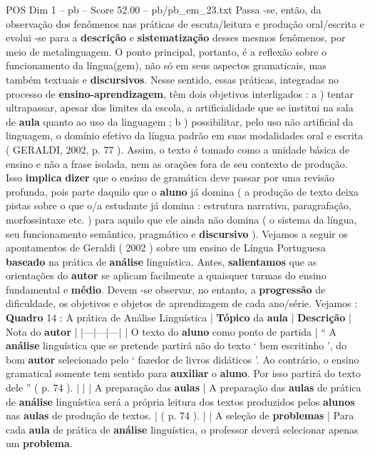 \begin{textsample}{POS Dim 1 – pb – Score 52.00 – pb/pb\_em\_23.txt}
Passa -se, então, da observação dos fenômenos nas práticas de escuta/leitura e produção oral/escrita e evolui -se para a \textbf{descrição} e \textbf{sistematização} desses mesmos fenômenos, por meio de metalinguagem.
O ponto principal, portanto, é a reflexão sobre o funcionamento da língua(gem), não só em seus aspectos gramaticais, mas também textuais e \textbf{discursivos}.
Nesse sentido, essas práticas, integradas no processo de \textbf{ensino-aprendizagem}, têm dois objetivos interligados : a ) tentar ultrapassar, apesar dos limites da escola, a artificialidade que se institui na sala de \textbf{aula} quanto ao uso da linguagem ; b ) possibilitar, pelo uso não artificial da linguagem, o domínio efetivo da língua padrão em suas modalidades oral e escrita ( GERALDI, 2002, p. 77 ).
Assim, o texto é tomado como a unidade básica de ensino e não a frase isolada, nem as orações fora de seu contexto de produção.
Isso \textbf{implica} \textbf{dizer} que o ensino de gramática deve passar por uma revisão profunda, pois parte daquilo que o \textbf{aluno} já domina ( a produção de texto deixa pistas sobre o que o/a estudante já domina : estrutura narrativa, paragrafação, morfossintaxe etc. ) para aquilo que ele ainda não domina ( o sistema da língua, seu funcionamento semântico, pragmático e \textbf{discursivo} ).
Vejamos a seguir os apontamentos de Geraldi ( 2002 ) sobre um ensino de Língua Portuguesa \textbf{baseado} na prática de \textbf{análise} linguística.
Antes, \textbf{salientamos} que as orientações do \textbf{autor} se aplicam facilmente a quaisquer turmas do ensino fundamental e \textbf{médio}.
Devem -se observar, no entanto, a \textbf{progressão} de dificuldade, os objetivos e objetos de aprendizagem de cada ano/série.
Vejamos : \textbf{Quadro} 14 : A prática de Análise Linguística | \textbf{Tópico} da \textbf{aula} | \textbf{Descrição} | Nota do \textbf{autor} | |---|---|---| | O texto do \textbf{aluno} como ponto de partida | “ A \textbf{análise} linguística que se pretende partirá não do texto ‘ bem escritinho ’, do bom \textbf{autor} selecionado pelo ‘ fazedor de livros didáticos ’.
Ao contrário, o ensino gramatical somente tem sentido para \textbf{auxiliar} o \textbf{aluno}.
Por isso partirá do texto dele ” ( p. 74 ). | | | A preparação das \textbf{aulas} | A preparação das \textbf{aulas} de prática de \textbf{análise} linguística será a própria leitura dos textos produzidos pelos \textbf{alunos} nas \textbf{aulas} de produção de textos. | ( p. 74 ). | | A seleção de \textbf{problemas} | Para cada \textbf{aula} de prática de \textbf{análise} linguística, o professor deverá selecionar apenas um \textbf{problema}.

\end{textsample}
